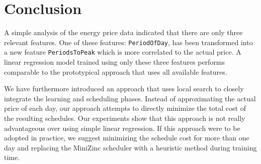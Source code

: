 \documentclass[a4,10pt]{article}
\begin{document}
\section{Conclusion}


A simple analysis of the energy price data indicated that there are only three relevant features. One of these features: \verb+PeriodOfDay+, has been transformed into a new feature \verb+PeriodsToPeak+ which is more correlated to the actual price. A linear regression model trained using only these three features performs comparable to the prototypical approach that uses all available features.

We have furthermore introduced an approach that uses local search to closely integrate the learning and scheduling phases. Instead of approximating the actual price of each day, our approach attempts to directly minimize the total cost of the resulting schedules. Our experiments show that this approach is not really advantageous over using simple linear regression. If this approach were to be adopted in practice, we suggest minimizing the schedule cost for more than one day and replacing the MiniZinc scheduler with a heuristic method during training time. 



\end{document}
